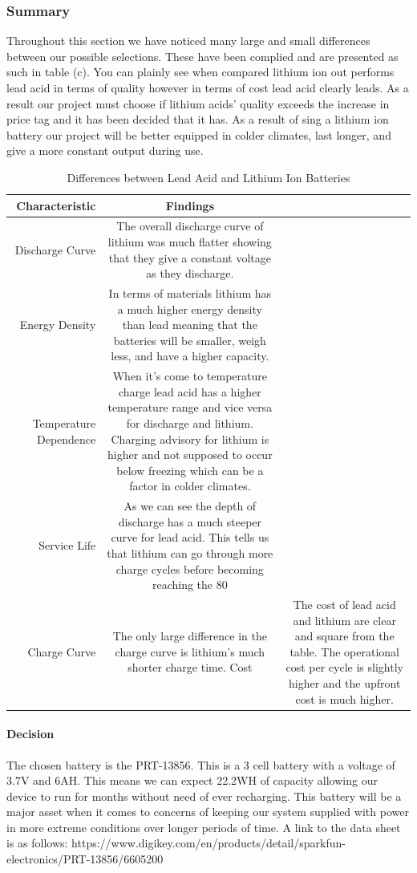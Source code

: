 \subsubsection{Summary}
Throughout this section we have noticed many large and small differences between our possible selections. These have been complied and are presented as such in table (c). You can plainly see when compared lithium ion out performs lead acid in terms of quality however in terms of cost lead acid clearly leads. As a result our project must choose if lithium acids' quality exceeds the increase in price tag and it has been decided that it has. As a result of sing a lithium ion battery our project will be better equipped in colder climates, last longer, and give a more constant output during use. 
\begin{table}
\centering\scriptsize
\caption{Differences between Lead Acid and Lithium Ion Batteries}
\begin{tabular}{|r|c|c|}
\hline
Characteristic&Findings \\\hline

Discharge Curve&The overall discharge curve of lithium was much flatter showing that they give a constant voltage as they discharge. 
  \\\hline
Energy Density&In terms of materials lithium has a much higher energy density than lead meaning that the batteries will be smaller, weigh less, and have a higher capacity. 
  \\\hline
Temperature Dependence&When it's come to temperature charge lead acid has a higher temperature range and vice versa for discharge and lithium. Charging advisory for lithium is higher and not supposed to occur below freezing which can be a factor in colder climates. 
  \\\hline
Service Life&As we can see the depth of discharge has a much steeper curve for lead acid. This tells us that lithium can go through more charge cycles before becoming reaching the 80%
  \\\hline
Charge Curve&The only large difference in the charge curve is lithium's much shorter charge time.  
Cost&The cost of lead acid and lithium are clear and square from the table. The operational cost per cycle is slightly higher and the upfront cost is much higher.
  \\\hline
\end{tabular}
\label{tab:battery-comparison}
\end{table}

\paragraph{Decision}
The chosen battery is the PRT-13856. This is a 3 cell battery with a voltage of 3.7V and 6AH. This means we can expect 22.2WH of capacity allowing our device to run for months without need of ever recharging. This battery will be a major asset when it comes to concerns of keeping our system supplied with power in more extreme conditions over longer periods of time. A link to the data sheet is as follows:
https://www.digikey.com/en/products/detail/sparkfun-electronics/PRT-13856/6605200

